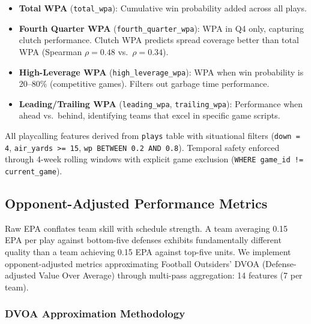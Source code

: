 \begin{itemize}
  \item \textbf{Total WPA} (\texttt{total\_wpa}): Cumulative win probability added across all plays.

  \item \textbf{Fourth Quarter WPA} (\texttt{fourth\_quarter\_wpa}): WPA in Q4 only, capturing clutch performance. Clutch WPA predicts spread coverage better than total WPA (Spearman $\rho = 0.48$ vs.\ $\rho = 0.34$).

  \item \textbf{High-Leverage WPA} (\texttt{high\_leverage\_wpa}): WPA when win probability is 20--80\% (competitive games). Filters out garbage time performance.

  \item \textbf{Leading/Trailing WPA} (\texttt{leading\_wpa}, \texttt{trailing\_wpa}): Performance when ahead vs.\ behind, identifying teams that excel in specific game scripts.
\end{itemize}

All playcalling features derived from \texttt{plays} table with situational filters (\texttt{down = 4}, \texttt{air\_yards >= 15}, \texttt{wp BETWEEN 0.2 AND 0.8}). Temporal safety enforced through 4-week rolling windows with explicit game exclusion (\texttt{WHERE game\_id != current\_game}).

\subsection{Opponent-Adjusted Performance Metrics}
\label{subsec:opponent-adjusted}

Raw EPA conflates team skill with schedule strength. A team averaging 0.15 EPA per play against bottom-five defenses exhibits fundamentally different quality than a team achieving 0.15 EPA against top-five units. We implement opponent-adjusted metrics approximating Football Outsiders' DVOA (Defense-adjusted Value Over Average) through multi-pass aggregation: 14 features (7 per team).

\subsubsection{DVOA Approximation Methodology}

